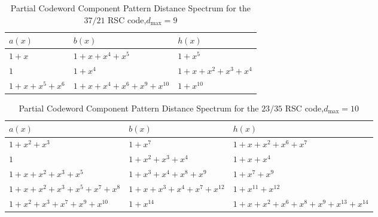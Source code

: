 \begin{table}[htbp]
 \caption{Partial Codeword Component Pattern Distance Spectrum for the $37/21$ RSC code,$d_{\text{max}}=9$}
\centering
 \begin{tabularx}{0.45\textwidth}{XlX} 
 \hline
 $a(x)$ & $b(x)$ & $h(x)$ \\ [0.5ex] 
 \hline\hline
$1+x$ & $1+x+x^{4}+x^5$ & $1+x^5$\\
\hline
$1$ & $1+x^4$ & $1+x+x^2+x^3+x^4$\\
\hline
$1+x+x^5+x^6$ & $1+x+x^4+x^6+x^9+x^{10}$ & $1+x^{10}$\\
 \end{tabularx}
 
 \label{novelTab14}
\end{table}

\begin{table}[htbp]
 \caption{Partial Codeword Component Pattern Distance Spectrum for the $23/35$ RSC code,$d_{\text{max}}=10$}
\centering
\begin{tabularx}{0.45\textwidth}{XlX} 
 \hline
 $a(x)$ & $b(x)$ & $h(x)$ \\ [0.5ex] 
 \hline\hline
$1+x^2+x^3$ & $1+x^7$ & $1+x+x^2+x^6+x^7$\\
\hline
$1$ & $1+x^2+x^3+x^4$ & $1+x+x^{4}$\\
\hline
$1+x+x^2+x^3+x^5$ & $1+x^3+x^4+x^8+x^9$ & $1+x^7+x^9$\\
\hline
$1+x+x^2+x^3+x^5+x^7+x^8$ & $1+x+x^3+x^4+x^7+x^{12}$ & $1+x^{11}+x^{12}$\\
\hline
$1+x^2+x^3+x^7+x^9+x^{10}$ & $1+x^{14}$ & $1+x+x^2+x^6+x^8+x^9+x^{13}+x^{14}$\\
 \end{tabularx}
 
 \label{novelTab15}
\end{table}

